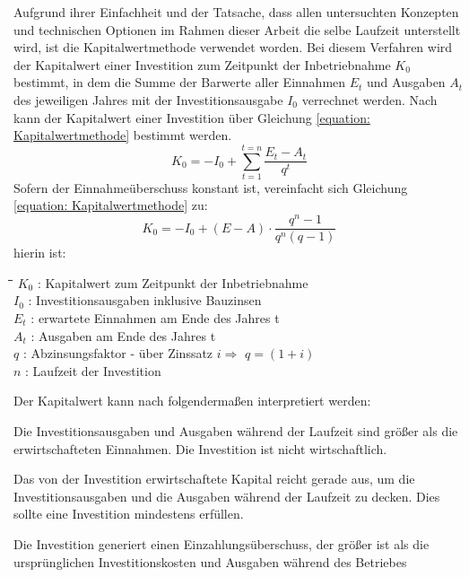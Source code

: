 Aufgrund ihrer Einfachheit und der Tatsache, dass allen untersuchten Konzepten und technischen Optionen im Rahmen dieser Arbeit die selbe Laufzeit unterstellt wird, ist die Kapitalwertmethode verwendet worden. Bei diesem Verfahren wird der Kapitalwert einer Investition zum Zeitpunkt der Inbetriebnahme $K_0$ bestimmt, in dem die Summe der Barwerte aller Einnahmen $E_t$ und Ausgaben $A_t$ des jeweiligen Jahres mit der Investitionsausgabe $I_0$ verrechnet werden. Nach \citet{Konstantin2013} kann der Kapitalwert einer Investition über Gleichung \ref{equation: Kapitalwertmethode} bestimmt werden.
	\begin{equation}\label{equation: Kapitalwertmethode}
		K_0 = -I_0 + \sum \limits_{t=1}^{t=n}\dfrac{E_t - A_t}{q^t}  
	\end{equation}
Sofern der Einnahmeüberschuss konstant ist, vereinfacht sich Gleichung \ref{equation: Kapitalwertmethode} zu:
	\begin{equation}
		\label{equation: Kapitalwert-vereinfact}
		K_0 = -I_0 + (E - A) \cdot \dfrac{q^n - 1}{q^n (q - 1)} 
	\end{equation}
hierin ist:
	\begin{tabbing}
		\hspace{0.5cm}\=\hspace{0.5cm}\=\hspace{0.5cm}\=\hspace{1cm}\=\kill
		\> $K_0$ \>: \> Kapitalwert zum Zeitpunkt der Inbetriebnahme\\
		\> $I_0$ \>:  \> Investitionsausgaben inklusive Bauzinsen\\
		\> $E_t$ \>: \> erwartete Einnahmen am Ende des Jahres t\\
		\> $A_t$ \>: \> Ausgaben am Ende des Jahres t\\
		\> $q$ \>: \> Abzinsungsfaktor - über Zinssatz $i \Rightarrow$ $q = (1 + i)$\\
		\> $n$ \>: \> Laufzeit der Investition\\
	\end{tabbing}
Der Kapitalwert kann nach \citet{Boesch2013} folgendermaßen interpretiert werden:
	\begin{description}[leftmargin=!,labelwidth=\widthof{\bfseries $K_0 < 0$:}]
		\item[$K_0 < 0$:] Die Investitionsausgaben und Ausgaben während der Laufzeit sind größer als die erwirtschafteten Einnahmen. Die Investition ist nicht wirtschaftlich.
		\item[$K_0 = 0$:] Das von der Investition erwirtschaftete Kapital reicht gerade aus, um die Investitionsausgaben und die Ausgaben während der Laufzeit zu decken. Dies sollte eine Investition mindestens erfüllen.
		\item[$K_0 > 0$:] Die Investition generiert einen Einzahlungsüberschuss, der größer ist als die ursprünglichen Investitionskosten und Ausgaben während des Betriebes
	\end{description}
